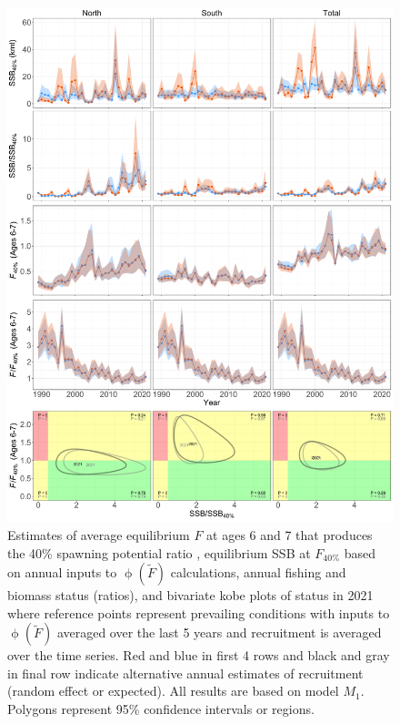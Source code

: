 \documentclass[
]{article}
\providecommand{\DIFaddtex}[1]{{\protect\color{blue}\uwave{#1}}} %
\providecommand{\DIFaddFL}[1]{\DIFadd{#1}} %
\providecommand{\DIFaddbeginFL}{} %
\providecommand{\DIFaddendFL}{} %
\providecommand{\DIFadd}[1]{\texorpdfstring{\DIFaddtex{#1}}{#1}} %
\newcommand{\DIFaddincludegraphics}[2][]{{\color{blue}\fbox{\DIFOincludegraphics[#1]{#2}}}} %
\DeclareRobustCommand{\DIFaddbeginFL}{\DIFOaddbeginFL \let\includegraphics\DIFaddincludegraphics} %
\DeclareRobustCommand{\DIFaddendFL}{\DIFOaddendFL \let\includegraphics\DIFOincludegraphics} %
\begin{document}
\begin{figure}

{\centering \includegraphics[height=0.85\textheight]{brp_status_results} 

}

\caption{Estimates of average equilibrium $F$ at ages 6 and 7 that produces the 40\% spawning potential ratio \DIFaddbeginFL \DIFaddFL{($F_{40\%}$)}\DIFaddendFL , equilibrium SSB at $F_{40\%}$ based on annual inputs to $\upphi(\widetilde{F})$ calculations, annual fishing and biomass status (ratios), and bivariate kobe plots of status in 2021 where reference points represent prevailing conditions with inputs to $\upphi(\widetilde{F})$ averaged over the last 5 years and recruitment is averaged over the time series. Red and blue in first 4 rows and black and gray in final row indicate alternative annual estimates of recruitment (random effect or expected). All results are based on model $M_1$. Polygons represent 95\% confidence intervals or regions.}\label{fig:annual-BRPs}
\end{figure}
\end{document}
